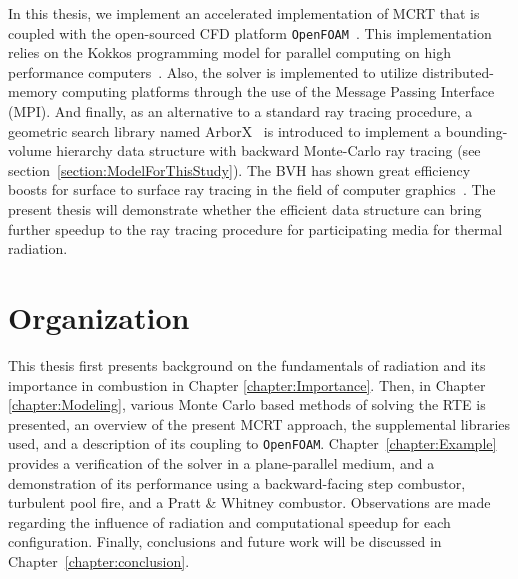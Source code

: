 In this thesis, we implement an accelerated implementation of MCRT that is coupled with the open-sourced CFD platform \verb|OpenFOAM|~\cite{Weller1998ATechniques}.
This implementation relies on the Kokkos programming model for parallel computing on high performance computers~\cite{Trott2021KokkosEra}.
Also, the solver is implemented to utilize distributed-memory computing platforms through the use of the Message Passing Interface (MPI).
And finally, as an alternative to a standard ray tracing procedure, a geometric search library named ArborX~\cite{Lebrun-Grandie2019ArborX:Library} is introduced to implement a bounding-volume hierarchy data structure with backward Monte-Carlo ray tracing (see section~\ref{section:ModelForThisStudy}). The BVH has shown great efficiency boosts for surface to surface ray tracing in the field of computer graphics~\cite{Meister2021ATracing}. The present thesis will demonstrate whether the efficient data structure can bring further speedup to the ray tracing procedure for participating media for thermal radiation.

\section{Organization}
This thesis first presents background on the fundamentals of radiation and its importance in combustion in Chapter \ref{chapter:Importance}. 
Then, in Chapter \ref{chapter:Modeling}, various Monte Carlo based methods of solving the RTE is presented, an overview of the present MCRT approach, the supplemental libraries used, and a description of its coupling to \verb|OpenFOAM|.
Chapter~\ref{chapter:Example} provides a verification of the solver in a plane-parallel medium, and a demonstration of its performance using a backward-facing step combustor, turbulent pool fire, and a Pratt \& Whitney combustor. Observations are made regarding the influence of radiation and computational speedup for each configuration.
Finally, conclusions and future work will be discussed in Chapter~\ref{chapter:conclusion}.